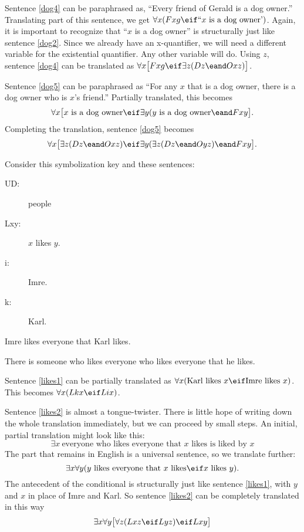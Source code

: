 Sentence \ref{dog4} can be paraphrased as, ``Every friend of Gerald is a dog owner.'' Translating part of this sentence, we get $\forall x(Fxg \eif\mbox{``$x$ is a dog owner'})$. Again, it is important to recognize that ``$x$ is a dog owner'' is structurally just like sentence \ref{dog2}. Since we already have an x-quantifier, we will need a different variable for the existential quantifier. Any other variable will do. Using $z$, sentence \ref{dog4} can be translated as $\forall x\bigl[Fxg \eif\exists z(Dz \eand Oxz)\bigr]$.

Sentence \ref{dog5} can be paraphrased as ``For any $x$ that is a dog owner, there is a dog owner who is $x$'s friend.'' Partially translated, this becomes $$\forall x\bigl[\mbox{$x$ is a dog owner}\eif\exists y(\mbox{$y$ is a dog owner}\eand Fxy\bigr].$$ Completing the translation, sentence \ref{dog5} becomes $$\forall x\bigl[\exists z(Dz \eand Oxz)\eif\exists y(\exists z(Dz \eand Oyz)\eand Fxy\bigr].$$

Consider this symbolization key and these sentences:
\begin{description}
\item[UD:] people
\item[Lxy:] $x$ likes $y$.
\item[i:] Imre.
\item[k:] Karl.
\end{description}
\begin{kormanize}
\item[\ex{likes1}]Imre likes everyone that Karl likes.
\item[\ex{likes2}]There is someone who likes everyone who likes everyone that he likes.
\end{kormanize}

Sentence \ref{likes1} can be partially translated as $\forall x(\mbox{Karl likes $x$}\eif\mbox{Imre likes $x$})$. This becomes $\forall x(Lkx\eif Lix)$.


Sentence \ref{likes2} is almost a tongue-twister. There is little hope of writing down the whole translation immediately, but we can proceed by small steps. An initial, partial translation might look like this: $$\exists x\ \mbox{everyone who likes everyone that $x$ likes is liked by $x$}$$
The part that remains in English is a universal sentence, so we translate further: $$\exists x\forall y(\mbox{$y$ likes everyone that $x$ likes}\eif\mbox{$x$ likes $y$}).$$
The antecedent of the conditional is structurally just like sentence \ref{likes1}, with $y$ and $x$ in place of Imre and Karl. So sentence \ref{likes2} can be completely translated in this way $$\exists x\forall y\bigl[\forall z(Lxz \eif Lyz) \eif Lxy\bigr]$$

